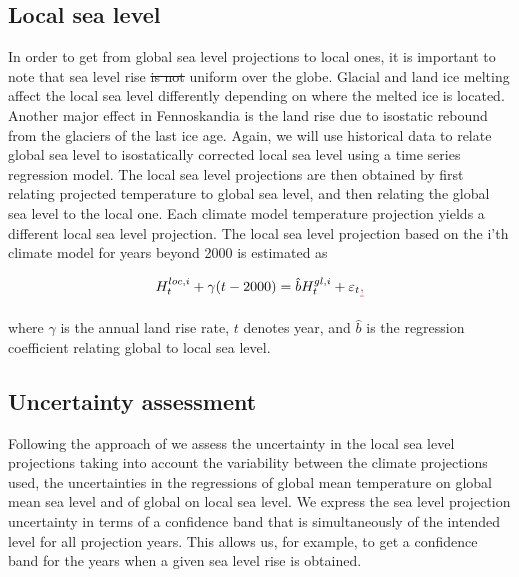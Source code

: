 \documentclass[draft,linenumbers]{agujournal}
\providecommand{\DIFadd}[1]{{\protect\color{blue}\uwave{#1}}} %
\providecommand{\DIFdel}[1]{{\protect\color{red}\sout{#1}}}                      %
\providecommand{\DIFaddbegin}{} %
\providecommand{\DIFaddend}{} %
\providecommand{\DIFdelbegin}{} %
\providecommand{\DIFdelend}{} %
\begin{document}
\subsection{Local sea level}
In order to get from global sea level projections to local ones, it is important to note that sea level rise \DIFdelbegin \DIFdel{is not }\DIFdelend \DIFaddbegin \DIFadd{not is }\DIFaddend uniform over the globe. Glacial and land ice melting affect the local sea level differently depending on where the melted ice is located.
Another major effect in Fennoskandia is the land rise due to isostatic rebound from the glaciers of the last ice age. 
Again, we will use historical data to relate global sea level to isostatically corrected local sea level using a time series regression model. 
The local sea level projections are then obtained by first relating projected temperature to global sea level, and then relating the global sea level to the local one. Each climate model temperature projection yields a different local sea level projection. The local sea level projection based on the i'th climate model for years beyond 2000 is estimated as
\DIFdelbegin %
\DIFdelend \DIFaddbegin 

\DIFaddend \[H_t^{loc,i} + \gamma (t -2000 ) = {\hat b} H_t^{gl,i}  + {\varepsilon _t}\DIFdelbegin \DIFdel{,}\DIFdelend \]
\DIFdelbegin %
\DIFdelend \DIFaddbegin 


\DIFaddend where $\gamma$ is the annual land rise rate, $t$ denotes year, and $ {\hat b} $ is the regression coefficient relating global to local sea level.




\subsection{Uncertainty assessment}
\label{unc_ass}
Following the approach of \citet{Guttorp2014} we assess the uncertainty in the local sea level projections taking into account the variability between the climate projections used, the uncertainties in the regressions of global mean temperature on global mean sea level and of global on local sea level. We express the sea level projection uncertainty in terms of a confidence band that is simultaneously of the intended  level  for all projection years. This allows us, for example, to get a confidence band for the years when a given sea level rise is obtained. 
\end{document}
